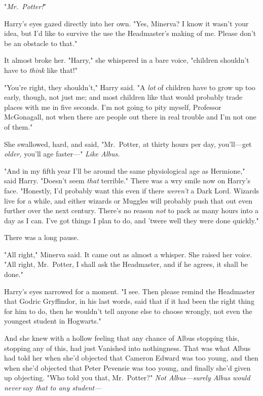 "\emph{Mr.~Potter!}"

Harry's eyes gazed directly into her own. "Yes, Minerva? I know it wasn't your 
idea, but I'd like to survive the use the Headmaster's making of me. Please 
don't be an obstacle to that."

It almost broke her. "Harry," she whispered in a bare voice, "children 
shouldn't have to \emph{think} like that!"

"You're right, they shouldn't," Harry said. "A \emph{lot} of children have to 
grow up too early, though, not just me; and most children like that would 
probably trade places with me in five seconds. I'm not going to pity myself, 
Professor McGonagall, not when there are people out there in real trouble and 
I'm not one of them."

She swallowed, hard, and said, "Mr.~Potter, at thirty hours per day, 
you'll---get \emph{older,} you'll age faster---" \emph{Like Albus.}

"And in my fifth year I'll be around the same physiological age as Hermione," 
said Harry. "Doesn't seem \emph{that} terrible." There was a wry smile now on 
Harry's face. "Honestly, I'd probably want this even if there \emph{weren't} a 
Dark Lord. Wizards live for a while, and either wizards or Muggles will 
probably push that out even further over the next century. There's no reason 
\emph{not} to pack as many hours into a day as I can. I've got things I plan to 
do, and 'twere well they were done quickly."

There was a long pause.

"All right," Minerva said. It came out as almost a whisper. She raised her 
voice. "All right, Mr.~Potter, I shall ask the Headmaster, and if he agrees, it 
shall be done."

Harry's eyes narrowed for a moment. "I see. Then please remind the Headmaster 
that Godric Gryffindor, in his last words, said that if it had been the right 
thing for him to do, then he wouldn't tell anyone else to choose wrongly, not 
even the youngest student in Hogwarts."

And she knew with a hollow feeling that any chance of Albus stopping this, 
stopping any of this, had just Vanished into nothingness. That was what Albus 
had told her when she'd objected that Cameron Edward was too young, and then 
when she'd objected that Peter Pevensie was too young, and finally she'd given 
up objecting. "Who told you that, Mr.~Potter?" \emph{Not Albus---surely Albus 
would never} say\emph{ that to any student---}

